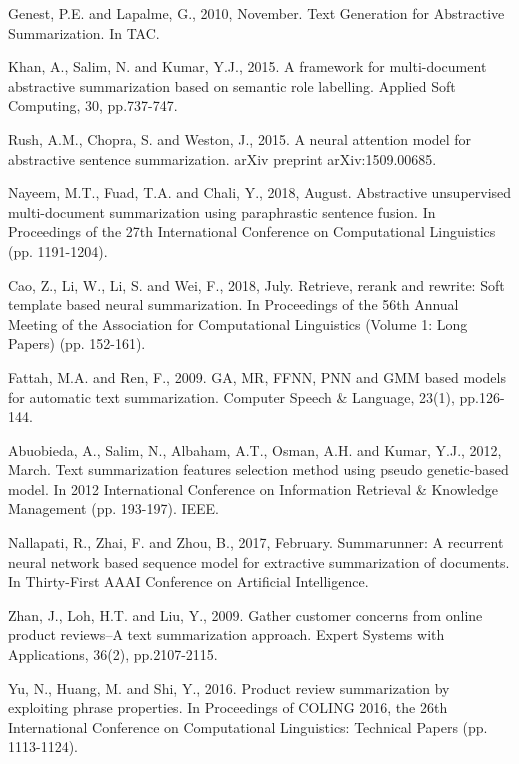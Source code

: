 \documentclass[letterpaper]{article}
\begin{document}
\begin{thebibliography}{}
Genest, P.E. and Lapalme, G., 2010, November. Text Generation for Abstractive Summarization. In TAC.

Khan, A., Salim, N. and Kumar, Y.J., 2015. A framework for multi-document abstractive summarization based on semantic role labelling. Applied Soft Computing, 30, pp.737-747.

Rush, A.M., Chopra, S. and Weston, J., 2015. A neural attention model for abstractive sentence summarization. arXiv preprint arXiv:1509.00685.


Nayeem, M.T., Fuad, T.A. and Chali, Y., 2018, August. Abstractive unsupervised multi-document summarization using paraphrastic sentence fusion. In Proceedings of the 27th International Conference on Computational Linguistics (pp. 1191-1204).

Cao, Z., Li, W., Li, S. and Wei, F., 2018, July. Retrieve, rerank and rewrite: Soft template based neural summarization. In Proceedings of the 56th Annual Meeting of the Association for Computational Linguistics (Volume 1: Long Papers) (pp. 152-161).

Fattah, M.A. and Ren, F., 2009. GA, MR, FFNN, PNN and GMM based models for automatic text summarization. Computer Speech \& Language, 23(1), pp.126-144.

Abuobieda, A., Salim, N., Albaham, A.T., Osman, A.H. and Kumar, Y.J., 2012, March. Text summarization features selection method using pseudo genetic-based model. In 2012 International Conference on Information Retrieval \& Knowledge Management (pp. 193-197). IEEE.

Nallapati, R., Zhai, F. and Zhou, B., 2017, February. Summarunner: A recurrent neural network based sequence model for extractive summarization of documents. In Thirty-First AAAI Conference on Artificial Intelligence.

Zhan, J., Loh, H.T. and Liu, Y., 2009. Gather customer concerns from online product reviews–A text summarization approach. Expert Systems with Applications, 36(2), pp.2107-2115.

Yu, N., Huang, M. and Shi, Y., 2016. Product review summarization by exploiting phrase properties. In Proceedings of COLING 2016, the 26th International Conference on Computational Linguistics: Technical Papers (pp. 1113-1124).



\end{thebibliography}
\end{document}
